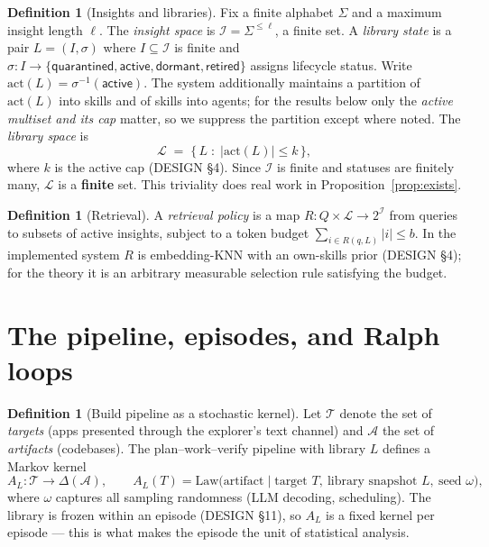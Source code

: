 \documentclass[11pt]{article}
\theoremstyle{plain}
\theoremstyle{definition}
\newtheorem{definition}[theorem]{Definition}
\theoremstyle{remark}
\newcommand{\cI}{\mathcal{I}}
\newcommand{\cL}{\mathcal{L}}
\newcommand{\cT}{\mathcal{T}}
\newcommand{\cA}{\mathcal{A}}
\begin{document}
\begin{definition}[Insights and libraries]\label{def:library}
Fix a finite alphabet $\Sigma$ and a maximum insight length $\ell$. The
\emph{insight space} is $\cI = \Sigma^{\le \ell}$, a finite set. A
\emph{library state} is a pair $L = (I, \sigma)$ where $I \subseteq \cI$ is
finite and $\sigma : I \to \{\textsf{quarantined}, \textsf{active},
\textsf{dormant}, \textsf{retired}\}$ assigns lifecycle status. Write
$\mathrm{act}(L) = \sigma^{-1}(\textsf{active})$. The system additionally
maintains a partition of $\mathrm{act}(L)$ into skills and of skills into
agents; for the results below only the \emph{active multiset and its cap}
matter, so we suppress the partition except where noted. The \emph{library
space} is
\[
  \cL \;=\; \bigl\{\, L \;:\; |\mathrm{act}(L)| \le k \,\bigr\},
\]
where $k$ is the active cap (DESIGN \S4). Since $\cI$ is finite and statuses
are finitely many, $\cL$ is a \textbf{finite} set. This triviality does real
work in Proposition~\ref{prop:exists}.
\end{definition}

\begin{definition}[Retrieval]\label{def:retrieval}
A \emph{retrieval policy} is a map $R : Q \times \cL \to 2^{\cI}$ from queries
to subsets of active insights, subject to a token budget
$\sum_{i \in R(q,L)} |i| \le b$. In the implemented system $R$ is
embedding-KNN with an own-skills prior (DESIGN \S4); for the theory it is an
arbitrary measurable selection rule satisfying the budget.
\end{definition}

\section{The pipeline, episodes, and Ralph loops}\label{sec:pipeline}

\begin{definition}[Build pipeline as a stochastic kernel]\label{def:pipeline}
Let $\cT$ denote the set of \emph{targets} (apps presented through the
explorer's text channel) and $\cA$ the set of \emph{artifacts} (codebases).
The plan--work--verify pipeline with library $L$ defines a Markov kernel
\[
  A_L : \cT \to \Delta(\cA),
  \qquad
  A_L(T) = \mathrm{Law}\bigl(\text{artifact} \mid \text{target } T,\
  \text{library snapshot } L,\ \text{seed } \omega\bigr),
\]
where $\omega$ captures all sampling randomness (LLM decoding, scheduling).
The library is frozen within an episode (DESIGN \S11), so $A_L$ is a fixed
kernel per episode --- this is what makes the episode the unit of statistical
analysis.
\end{definition}
\end{document}
